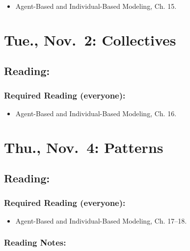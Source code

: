 \documentclass[
]{article}
\providecommand{\tightlist}{%
  \setlength{\itemsep}{0pt}\setlength{\parskip}{0pt}}
\begin{document}
\begin{itemize}
\tightlist
\item
  Agent-Based and Individual-Based Modeling, Ch. 15.
\end{itemize}

\hypertarget{tue.-nov.-2-collectives}{%
\section{Tue., Nov.~2: Collectives}\label{tue.-nov.-2-collectives}}

\hypertarget{reading-18}{%
\subsection{Reading:}\label{reading-18}}

\hypertarget{required-reading-everyone-15}{%
\subsubsection{Required Reading
(everyone):}\label{required-reading-everyone-15}}

\begin{itemize}
\tightlist
\item
  Agent-Based and Individual-Based Modeling, Ch. 16.
\end{itemize}

\hypertarget{thu.-nov.-4-patterns}{%
\section{Thu., Nov.~4: Patterns}\label{thu.-nov.-4-patterns}}

\hypertarget{reading-19}{%
\subsection{Reading:}\label{reading-19}}

\hypertarget{required-reading-everyone-16}{%
\subsubsection{Required Reading
(everyone):}\label{required-reading-everyone-16}}

\begin{itemize}
\tightlist
\item
  Agent-Based and Individual-Based Modeling, Ch. 17--18.
\end{itemize}

\hypertarget{reading-notes-13}{%
\subsubsection{Reading Notes:}\label{reading-notes-13}}
\end{document}
